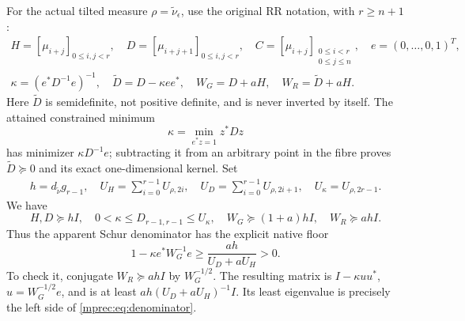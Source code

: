 \documentclass[11pt]{article}
\begin{document}
For the actual tilted measure $\rho=\widetilde\nu_\epsilon$,
use the original RR notation, with $r\ge n+1$:
\begin{equation}\label{mprec:eq:RR}
 \begin{gathered}
 H=[\mu_{i+j}]_{0\le i,j<r},\quad
 D=[\mu_{i+j+1}]_{0\le i,j<r},\quad
 C=[\mu_{i+j}]_{\substack{0\le i<r\\0\le j\le n}},\quad
 e=(0,\ldots,0,1)^T,\\
 \kappa=(e^*D^{-1}e)^{-1},\quad \widetilde D=D-\kappa ee^*,
 \quad W_G=D+aH,\quad W_R=\widetilde D+aH.
 \end{gathered}
\end{equation}
Here $\widetilde D$ is semidefinite, not positive definite, and
is never inverted by itself. The attained constrained minimum
\begin{equation}\label{mprec:eq:kmin}
 \kappa=\min_{e^*z=1}z^*Dz
\end{equation}
has minimizer $\kappa D^{-1}e$; subtracting it from an arbitrary
point in the fibre proves $\widetilde D\succeq0$ and its exact
one-dimensional kernel. Set
\begin{equation}\label{mprec:eq:RRconstants}
 \begin{gathered}
 h=d_{\widetilde\nu}g_{r-1},\quad
 U_H=\sum_{i=0}^{r-1}U_{\rho,2i},\quad
 U_D=\sum_{i=0}^{r-1}U_{\rho,2i+1},\quad U_\kappa=U_{\rho,2r-1}.
 \end{gathered}
\end{equation}
We have
\begin{equation}\label{mprec:eq:radaufloor}
 H,D\succeq hI,\quad 0<\kappa\le D_{r-1,r-1}\le U_\kappa,
 \quad W_G\succeq(1+a)hI,\quad W_R\succeq ahI.
\end{equation}
Thus the apparent Schur denominator has the explicit native floor
\begin{equation}\label{mprec:eq:denominator}
 \boxed{1-\kappa e^*W_G^{-1}e\ge
                    \frac{ah}{U_D+aU_H}>0.}
\end{equation}
To check it, conjugate $W_R\succeq ahI$ by $W_G^{-1/2}$.
The resulting matrix is $I-\kappa uu^*$, $u=W_G^{-1/2}e$,
and is at least $ah(U_D+aU_H)^{-1}I$. Its least eigenvalue
is precisely the left side of \eqref{mprec:eq:denominator}.
\end{document}
